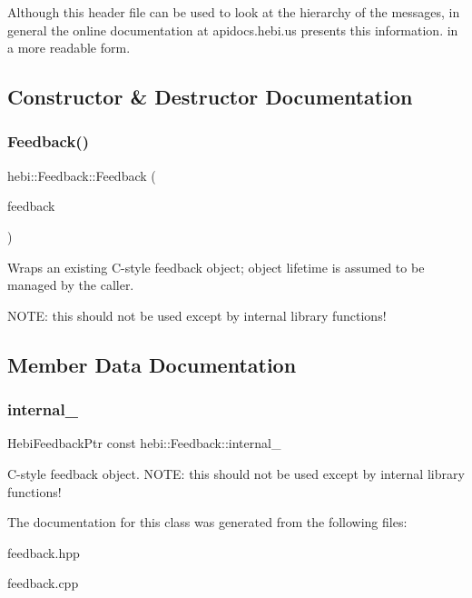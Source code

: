 Although this header file can be used to look at the hierarchy of the messages, in general the online documentation at apidocs.\+hebi.\+us presents this information. in a more readable form. 

\subsection{Constructor \& Destructor Documentation}
\mbox{\label{classhebi_1_1Feedback_a172321e2516f2bca57a1e32d0263bd3f}} 
\subsubsection{\texorpdfstring{Feedback()}{Feedback()}}
{\footnotesize\ttfamily hebi\+::\+Feedback\+::\+Feedback (\begin{DoxyParamCaption}\item[{Hebi\+Feedback\+Ptr}]{feedback }\end{DoxyParamCaption})}



Wraps an existing C-\/style feedback object; object lifetime is assumed to be managed by the caller. 

N\+O\+TE\+: this should not be used except by internal library functions! 

\subsection{Member Data Documentation}
\mbox{\label{classhebi_1_1Feedback_ae91da5bbb8a77c135981df418d7515b1}} 
\subsubsection{\texorpdfstring{internal\+\_\+}{internal\_}}
{\footnotesize\ttfamily Hebi\+Feedback\+Ptr const hebi\+::\+Feedback\+::internal\+\_\+}

C-\/style feedback object. N\+O\+TE\+: this should not be used except by internal library functions! 

The documentation for this class was generated from the following files\+:\begin{DoxyCompactItemize}
\item 
feedback.\+hpp\item 
feedback.\+cpp\end{DoxyCompactItemize}

